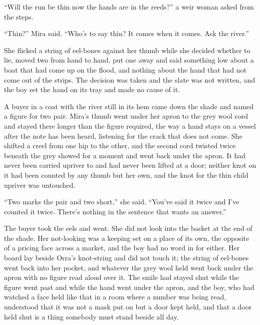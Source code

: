 “Will the run be thin now the hands are in the reeds?” a weir woman asked from the steps.

“Thin?” Mira said. “Who's to say thin? It comes when it comes. Ask the river.”

She flicked a string of eel-bones against her thumb while she decided whether to lie, moved two from hand to hand, put one away and said something low about a boat that had come up on the flood, and nothing about the hand that had not come out of the strips. The decision was taken and the slate was not written, and the boy set the hand on its tray and made no cause of it.

A buyer in a coat with the river still in its hem came down the shade and named a figure for two pair. Mira's thumb went under her apron to the grey wool cord and stayed there longer than the figure required, the way a hand stays on a vessel after the note has been heard, listening for the crack that does not come. She shifted a creel from one hip to the other, and the second cord twisted twice beneath the grey showed for a moment and went back under the apron. It had never been carried upriver to  and had never been lifted at a door; neither knot on it had been counted by any thumb but her own, and the knot for the thin child upriver was untouched.

“Two marks the pair and two short,” she said. “You've said it twice and I've counted it twice. There's nothing in the sentence that wants an answer.”

The buyer took the eels and went. She did not look into the basket at the end of the shade. Her not-looking was a keeping set on a place of its own, the opposite of a pricing face across a market, and the boy had no word in  for either. Her board lay beside Orra's knot-string and did not touch it; the string of eel-bones went back into her pocket, and whatever the grey wool held went back under the apron with no figure read aloud over it. The smile had stayed shut while the figure went past and while the hand went under the apron, and the boy, who had watched a face held like that in a room where a number was being read, understood that it was not a mask put on but a door kept held, and that a door held shut is a thing somebody must stand beside all day.

\scenebreak

